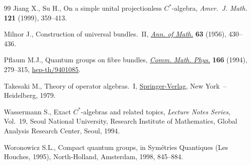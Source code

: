 \documentclass[pdftex]{sigma}
\numberwithin{equation}{section}
\begin{document}
\begin{thebibliography}{99}
Jiang X., Su H., On a simple unital projectionless {$C^*$}-algebra,
  \textit{Amer.~J. Math.} \textbf{121} (1999), 359--413.

Milnor J., Construction of universal bundles.~{II}, \href{http://dx.doi.org/10.2307/1970012}{\textit{Ann. of Math.}}
  \textbf{63} (1956), 430--436.

Pf\/laum M.J., Quantum groups on f\/ibre bundles, \href{http://dx.doi.org/10.1007/BF02112317}{\textit{Comm. Math. Phys.}}
  \textbf{166} (1994), 279--315, \href{http://arxiv.org/abs/hep-th/9401085}{hep-th/9401085}.

Takesaki M., Theory of operator algebras.~{I}, \href{http://dx.doi.org/10.1007/978-1-4612-6188-9}{Springer-Verlag}, New York~--
  Heidelberg, 1979.

Wassermann S., Exact {$C^*$}-algebras and related topics, \textit{Lecture Notes
  Series}, Vol.~19, Seoul National University, Research Institute of
  Mathematics, Global Analysis Research Center, Seoul, 1994.

Woronowicz S.L., Compact quantum groups, in Sym\'etries Quantiques ({L}es
  {H}ouches, 1995), North-Holland, Amsterdam, 1998, 845--884.

\end{thebibliography}\LastPageEnding
\end{document}
